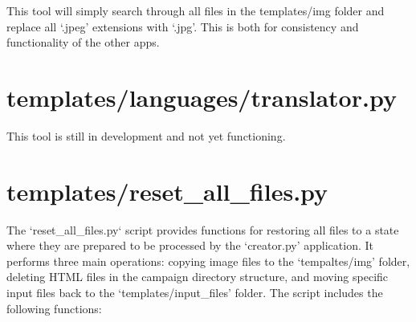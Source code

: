 This tool will simply search through all files in the templates/img folder and replace all `.jpeg' extensions with `.jpg'. This is both for consistency and  functionality of the other apps.



















\section{templates/languages/translator.py}

This tool is still in development and not yet functioning.



















\section{templates/reset\_all\_files.py}

The `reset\_all\_files.py` script provides functions for restoring all files to a state where they are prepared to be processed by the `creator.py' application. It performs three main operations: copying image files to the `tempaltes/img' folder, deleting HTML files in the campaign directory structure, and moving specific input files back to the `templates/input\_files' folder. The script includes the following functions:

